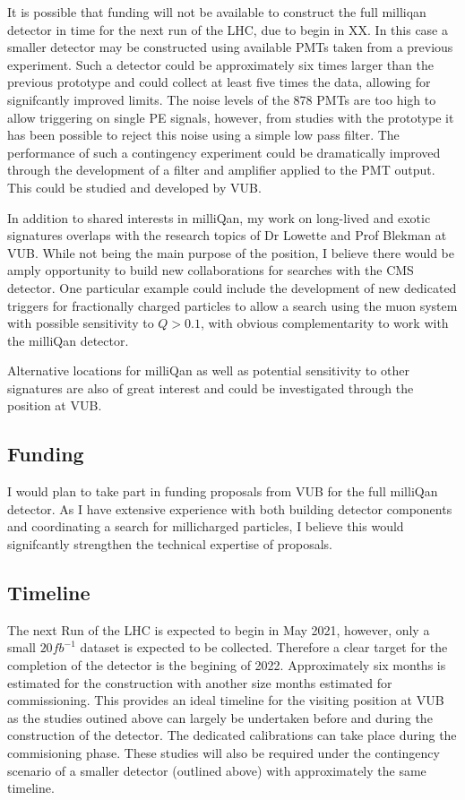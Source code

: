 \documentclass[11pt]{article}
\theoremstyle{plain} \numberwithin{equation}{section}
\theoremstyle{definition}
\begin{document}
It is possible that funding will not be available to construct the full milliqan detector in
time for the next run of the LHC, due to begin in XX. In this case a smaller detector may be constructed using
available PMTs taken from a previous experiment. Such a detector could be approximately six times
larger than the previous prototype and could collect at least five times the data, allowing for
signifcantly improved limits. The noise levels of the 878 PMTs 
are too high to allow triggering on single PE signals, however, from studies with the prototype
it has been possible to reject this noise using a simple low pass filter. The performance of
such a contingency experiment could be dramatically improved through the development of a
filter and amplifier applied to the PMT output. This could be studied and developed by VUB.

In addition to shared interests in milliQan, my work on long-lived and exotic signatures
overlaps with the research topics of Dr Lowette and Prof Blekman at VUB. While not
being the main purpose of the position, I believe there would be amply opportunity
to build new collaborations for searches with the CMS detector. One particular example 
could include the development of new dedicated triggers for fractionally 
charged particles to allow a search using the muon system with possible 
sensitivity to $Q> 0.1$, with obvious complementarity to work with the milliQan detector.

Alternative locations for milliQan as well as potential sensitivity to other signatures
are also of great interest and could be investigated through the position at VUB.

\subsection*{Funding}

I would plan to take part in funding proposals from VUB for the full milliQan detector. 
As I have extensive experience with both building detector components and coordinating 
a search for millicharged particles, I believe this would signifcantly strengthen the technical
expertise of proposals.

\subsection*{Timeline}

The next Run of the LHC is expected to begin in May 2021, however, only a small $20fb^{-1}$ dataset is 
expected to be collected. Therefore a clear target for the completion of the detector
is the begining of 2022. Approximately six months is estimated for the construction with another size months
estimated for commissioning. This provides an ideal timeline for the visiting position at VUB as 
the studies outined above can largely be undertaken before and during the construction of the detector.
The dedicated calibrations can take place during the commisioning phase. These studies will also be
required under the contingency scenario of a smaller detector (outlined above) with approximately the same timeline.
\end{document}

